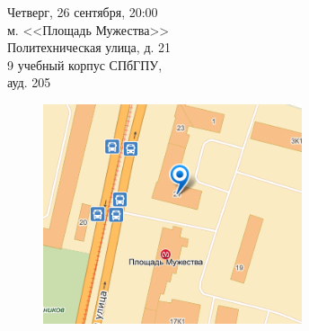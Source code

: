 \documentclass[12pt]{article}
\begin{document}
\begin{large}
Четверг, 26 сентября, 20:00\\
м. <<Площадь Мужества>>\\
Политехническая улица, д. 21\\
9 учебный корпус СПбГПУ, \\
ауд. 205
\end{large}

\begin{figure}
  \begin{center}
    \includegraphics[width=3in]{map.png}
  \end{center}
\end{figure}
\end{document}
